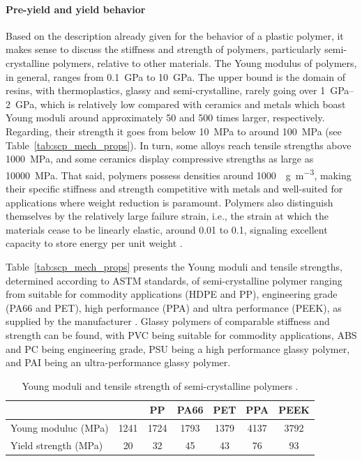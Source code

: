 \paragraph{Pre-yield and yield behavior}

Based on the description already given for the behavior of a plastic polymer, it makes sense to discuss the stiffness and strength of polymers, particularly semi-crystalline polymers, relative to other materials.
The Young modulus of polymers, in general, ranges from \SI{0.1}{\giga\pascal} to \SI{10}{\giga\pascal}.
The upper bound is the domain of resins, with thermoplastics, glassy and semi-crystalline, rarely going over \SIrange{1}{2}{\giga\pascal}, which is relatively low compared with ceramics and metals which boast Young moduli around approximately 50 and 500 times larger, respectively.
Regarding, their strength it goes from below \SI{10}{\mega\pascal} to around \SI{100}{\mega\pascal} (see Table~\ref{tab:scp_mech_props}).
In turn, some alloys reach tensile strengths above \SI{1000}{\mega\pascal}, and some ceramics display compressive strengths as large as \SI{10000}{\mega\pascal}.
That said, polymers possess densities around \SI{1000}{\killo\gram\per\meter\cubed}, making their specific stiffness and strength competitive with metals and well-suited for applications where weight reduction is paramount.
Polymers also distinguish themselves by the relatively large failure strain, i.e., the strain at which the materials cease to be linearly elastic, around 0.01 to 0.1, signaling excellent capacity to store energy per unit weight \citep{ashbyMaterialsSelectionMechanical1999}.

Table~\ref{tab:scp_mech_props} presents the Young moduli and tensile strengths, determined according to ASTM standards, of semi-crystalline polymer ranging from suitable for commodity applications (HDPE and PP), engineering grade (PA66 and PET), high performance (PPA) and ultra performance (PEEK), as supplied by the manufacturer \cite{rtpcompanyProductGuideRTP2021}.
Glassy polymers of comparable stiffness and strength can be found, with PVC being suitable for commodity applications, ABS and PC being engineering grade, PSU being a high performance glassy polymer, and PAI being an ultra-performance glassy polymer.
\begin{table}[hbpt]
	\centering
	\caption{Young moduli and tensile strength of semi-crystalline polymers \citep{rtpcompanyProductGuideRTP2021}.}
	\label{tab:matpropsnecking}
	\begin{tabular}{lcccccc}
		\hline\hline
		& \vphantom{\Big |}{HDPE} &{PP} &{PA66} &{PET} & {PPA}  &{PEEK} \\
		\hline
		\vphantom{\Big |}Young moduluc (\si{\mega\pascal}) & 1241 & 1724 & 1793 & 1379 & 4137 & 3792  \\
		\vphantom{\Big |}Yield strength (\si{\mega\pascal}) & 20 & 32 & 45 & 43 & 76  & 93 \\
		\hline\hline
	\end{tabular}
\end{table}

